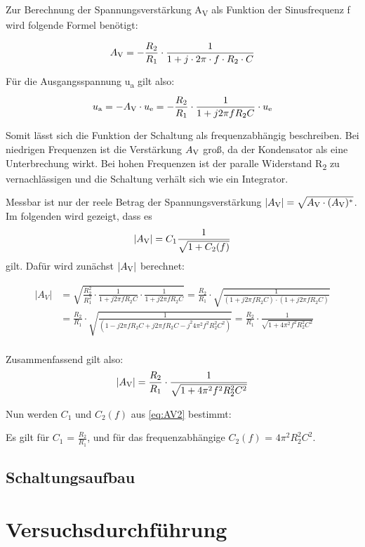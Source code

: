Zur Berechnung der Spannungsverstärkung A\textsubscript{V} als
Funktion der Sinusfrequenz f wird folgende Formel benötigt:

\begin{equation}
    A\textsubscript{V} = -\frac{R_2}{R_1} \cdot \frac{1}{1 + j \cdot 2 \pi \cdot f \cdot R_2 \cdot C}
    \label{eq:AV}
\end{equation}

Für die Ausgangsspannung u\textsubscript{a} gilt also:
\begin{equation}
    u\textsubscript{a} = -A\textsubscript{V} \cdot u\textsubscript{e} = -\frac{R_2}{R_1} \cdot \frac{1}{1 + j 2 \pi f R_2 C} \cdot u\textsubscript{e}
    \label{eq:AV}
\end{equation}

Somit lässt sich die Funktion der Schaltung als frequenzabhängig beschreiben.
Bei niedrigen Frequenzen ist die Verstärkung $A\textsubscript{V}$ groß,
da der Kondensator als eine Unterbrechung wirkt. Bei hohen Frequenzen
ist der paralle Widerstand R\textsubscript{2} zu vernachlässigen und
die Schaltung verhält sich wie ein Integrator.


Messbar ist nur der reele Betrag der Spannungsverstärkung  
$|A\textsubscript{V}| = \sqrt{A\textsubscript{V} \cdot (A\textsubscript{V})^{*}} $.
Im folgenden wird gezeigt, dass es
\begin{equation}
    |A\textsubscript{V}| = C_1\frac{1}{\sqrt{1 + C_2(f)}}
    \label{eq:AV2}
\end{equation} 
gilt. Dafür wird zunächst 
$|A\textsubscript{V}|$ berechnet:

\[
    \begin{aligned}
    |A_V| & = \sqrt{\frac{R_2^2}{R_1^2} \cdot \frac{1}{1 + j 2 \pi f R_2 C} \cdot \frac{1}{1 + j 2 \pi f R_2 C}}
    = \frac{R_2}{R_1} \cdot \sqrt{\frac{1}{(1 + j 2 \pi f R_2 C) \cdot (1 + j 2 \pi f R_2 C)}} \\
    & = \frac{R_2}{R_1} \cdot \sqrt{\frac{1}{(1 - j 2 \pi f R_2 C + j 2 \pi f R_2 C - j^2 4 \pi^2 f^2 R_2 ^ 2 C^2)}}
    = \frac{R_2}{R_1} \cdot \frac{1}{\sqrt{1 + 4 \pi^2 f^2 R_2 ^ 2 C^2}} \\
    \end{aligned}
\]

Zusammenfassend gilt also:
\begin{equation}
    |A\textsubscript{V}| = \frac{R_2}{R_1} \cdot \frac{1}{\sqrt{1 + 4 \pi^2 f^2 R_2 ^ 2 C^2}}
    \label{eq:AV3}
\end{equation}

Nun werden $C_1$ und $C_2(f)$ aus \ref{eq:AV2} bestimmt: \par
Es gilt für $C_1$ = $\frac{R_2}{R_1}$,
 und für das frequenzabhängige $C_2(f)$ = $4 \pi^2 R_2 ^ 2 C^2$.



\subsection{Schaltungsaufbau}

\section{Versuchsdurchführung}